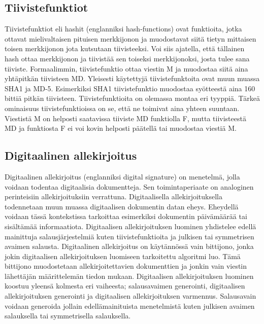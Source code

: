  \subsection{Tiivistefunktiot}
 Tiivistefunktiot eli hashit (englanniksi hash-functions) ovat funktioita, jotka ottavat mielivaltaisen pituisen merkkijonon ja muodostavat siitä tietyn mittaisen toisen merkkijonon jota kutsutaan tiivisteeksi. Voi siis ajatella, että tällainen hash ottaa merkkijonon ja tiivistää sen toiseksi merkkijonoksi, josta tulee sana tiiviste. Formaalimmin, tiivistefunktio ottaa viestin M ja muodostaa siitä aina yhtäpitkän tiivisteen MD. Yleisesti käytettyjä tiivistefunktoita ovat muun muassa SHA1 ja MD-5. Esimerkiksi SHA1 tiivistefunktio muodostaa syötteestä aina 160 bittiä pitkän tiivisteen. Tiivistefunktioita on olemassa montaa eri tyyppiä. Tärkeä ominaisuus tiivistefunktioissa on se, että ne toimivat aina yhteen suuntaan. Viestistä M on helposti saatavissa tiiviste MD funktiolla F, mutta tiivisteestä MD ja funktiosta F ei voi kovin helposti päätellä tai muodostaa viestiä M.
 
 \subsection{Digitaalinen allekirjoitus}
 Digitaalinen allekirjoitus (englanniksi digital signature) on menetelmä, jolla voidaan todentaa digitaalisia dokumentteja. Sen toimintaperiaate on analoginen perinteisiin allekirjoituksiin verrattuna. Digitaalisella allekirjoituksella todennetaan muun muassa digitaalisen dokumentin datan eheys. Eheydellä voidaan tässä kontekstissa tarkoittaa esimerkiksi dokumentin päivämäärää tai sisältämää informaatiota. Digitaalisen allekirjoituksen luominen yhdistelee edellä mainittuja salausjärjestelmiä kuten tiivistefunktioita ja julkisen tai symmetrisen avaimen salausta. Digitaalinen allekirjoitus on käytännössä vain bittijono, jonka jokin digitaalisen allekirjoituksen luomiseen tarkoitettu algoritmi luo. Tämä bittijono muodostetaan allekirjoitettavien dokumenttien ja jonkin vain viestin lähettäjän määrittelemän tiedon mukaan. Digitaalisen allekirjoituksen luominen koostuu yleensä kolmesta eri vaiheesta; salausavaimen generointi, digitaalisen allekirjoituksen generointi ja digitaalisen allekirjoituksen varmennus. Salausavain voidaan generoida jollain edellämainituista menetelmistä kuten julkisen avaimen salauksella tai symmetrisella salauksella.